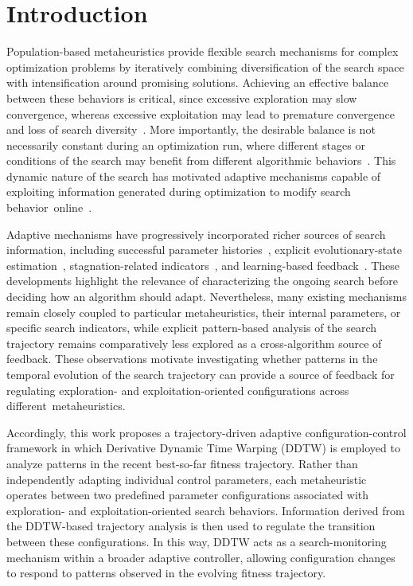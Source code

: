\documentclass[mathematics,article,accept,moreauthors]{Definitions/mdpi}
\begin{document}

\section{Introduction}

Population-based metaheuristics provide flexible search mechanisms for complex optimization problems by iteratively combining diversification of the search space with intensification around promising solutions. Achieving an effective balance between these behaviors is critical, since excessive exploration may slow convergence, whereas excessive exploitation may lead to premature convergence and loss of search diversity~\cite{dhiman2026decade,vcrepinvsek2013exploration,zhang2019balancing}. More importantly, the desirable balance is not necessarily constant during an optimization run, where different stages or conditions of the search may benefit from different algorithmic behaviors~\cite{vega2021learning,zhang2019balancing}. This dynamic nature of the search has motivated adaptive mechanisms capable of exploiting information generated during optimization to modify search \mbox{behavior online~\cite{aleti2016systematic}.}

Adaptive mechanisms have progressively incorporated richer sources of search information, including successful parameter histories~\cite{zhang2009jade}, explicit evolutionary-state estimation~\cite{zhan2009adaptive}, stagnation-related indicators~\cite{liu2024adaptive}, and learning-based feedback~\cite{tatsis2023reinforcement}. These developments highlight the relevance of characterizing the ongoing search before deciding how an algorithm should adapt. Nevertheless, many existing mechanisms remain closely coupled to particular metaheuristics, their internal parameters, or specific search indicators, while explicit pattern-based analysis of the search trajectory remains comparatively less explored as a cross-algorithm source of feedback. These observations motivate investigating whether patterns in the temporal evolution of the search trajectory can provide a source of feedback for regulating exploration- and exploitation-oriented configurations across \mbox{different metaheuristics.}

Accordingly, this work proposes a trajectory-driven adaptive configuration-control framework in which Derivative Dynamic Time Warping (DDTW) is employed to analyze patterns in the recent best-so-far fitness trajectory. Rather than independently adapting individual control parameters, each metaheuristic operates between two predefined parameter configurations associated with exploration- and exploitation-oriented search behaviors. Information derived from the DDTW-based trajectory analysis is then used to regulate the transition between these configurations. In this way, DDTW acts as a search-monitoring mechanism within a broader adaptive controller, allowing configuration changes to respond to patterns observed in the evolving fitness trajectory.
\end{document}
